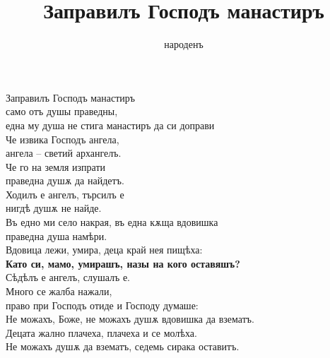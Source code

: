 \documentclass{article}
\title{Заправилъ Господъ манастиръ}
\author{народенъ}
\begin{document}
\maketitle

Заправилъ Господъ манастиръ \\
само отъ душы праведны, \\
една му душа не стига 
манастиръ да си доправи \\

Че извика Господъ ангела, \\
ангела -- светий архангелъ. \\

Че го на земля изпрати \\
праведна душѫ да найдетъ. \\

Ходилъ е ангелъ, търсилъ е \\
нигдѣ душѫ не найде. \\

Въ едно ми село накрая, въ една кѫща вдовишка  \\
праведна душа намѣри. \\
Вдовица лежи, умира, деца край нея пищѣха: \\

\textbf{Като си, мамо, умирашъ, назы на кого оставяшъ? }\\

Сѣдѣлъ е ангелъ, слушалъ е.  \\
Много се жалба нажали,  \\
право при Господъ отиде и Господу думаше: \\

Не можахъ, Боже, не можахъ душѫ вдовишка да взематъ. \\
Децата жално плачеха, плачеха и се молѣха. \\
Не можахъ душѫ да взематъ, седемь сирака оставитъ. \\
 
 
 
\end{document}
